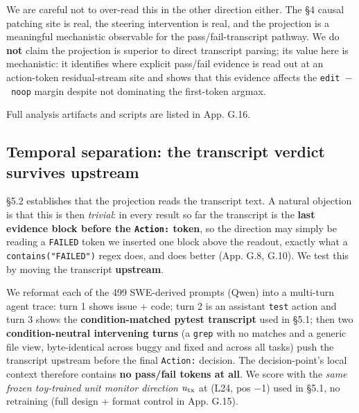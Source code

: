 \documentclass[
  11pt,
  a4paper]{article}
\begin{document}
We are careful not to over-read this in the other direction either. The
\S{}4 causal patching site is real, the steering intervention is real, and
the projection is a meaningful mechanistic observable for the
pass/fail-transcript pathway. We do \textbf{not} claim the projection is
superior to direct transcript parsing; its value here is mechanistic: it
identifies where explicit pass/fail evidence is read out at an
action-token residual-stream site and shows that this evidence affects
the \texttt{edit\ \ensuremath{-}\ noop} margin despite not dominating the first-token
argmax.

Full analysis artifacts and scripts are listed in App. G.16.

\subsection{Temporal separation: the transcript verdict survives
upstream}\label{temporal-separation-the-transcript-verdict-survives-upstream}

\S{}5.2 establishes that the projection reads the transcript text. A
natural objection is that this is then \emph{trivial}: in every result
so far the transcript is the \textbf{last evidence block before the
\texttt{Action:} token}, so the direction may simply be reading a
\texttt{FAILED} token we inserted one block above the readout, exactly
what a \texttt{contains("FAILED")} regex does, and does better (App.
G.8, G.10). We test this by moving the transcript \textbf{upstream}.

We reformat each of the 499 SWE-derived prompts (Qwen) into a multi-turn
agent trace: turn 1 shows issue + code; turn 2 is an assistant
\texttt{test} action and turn 3 shows the \textbf{condition-matched
pytest transcript} used in \S{}5.1; then two \textbf{condition-neutral
intervening turns} (a \texttt{grep} with no matches and a generic file
view, byte-identical across buggy and fixed and across all tasks) push
the transcript upstream before the final \texttt{Action:} decision. The
decision-point's local context therefore contains \textbf{no pass/fail
tokens at all}. We score with the \emph{same frozen toy-trained unit
monitor direction \(u_{\rm tx}\)} at (L24, pos \ensuremath{-}1) used in \S{}5.1, no
retraining (full design + format control in App. G.15).
\end{document}
